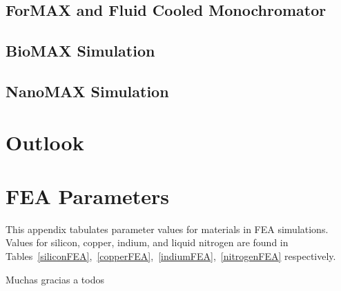 \documentclass[preprint]{iucr}              %
\begin{document}
\subsection{ForMAX and Fluid Cooled Monochromator}\label{formax}
\subsection{BioMAX Simulation}\label{biomax}
\subsection{NanoMAX Simulation}\label{nanomax}
\section{Outlook}


\appendix
\section{FEA Parameters}\label{feaparameters}

This appendix tabulates parameter values for materials in FEA simulations. Values for silicon, copper, indium, and liquid nitrogen are found in Tables~\ref{siliconFEA},~\ref{copperFEA},~\ref{indiumFEA},~\ref{nitrogenFEA} respectively.
\vspace{1.5cm}







Muchas gracias a todos


\end{document}
